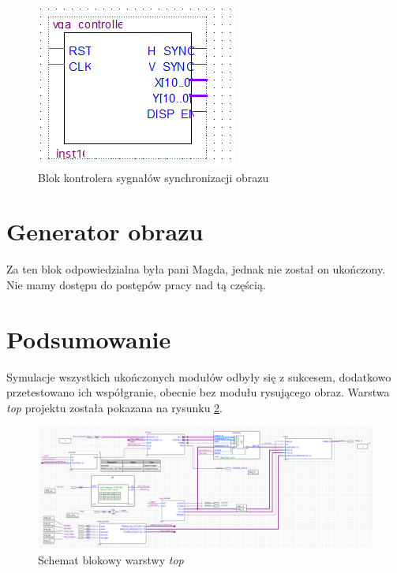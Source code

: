 \begin{figure}[H]
	\centering
	\includegraphics[width = 0.3 \paperwidth]{images/VGA_controller_block_diagram.png}
	\caption{Blok kontrolera sygnałów synchronizacji obrazu}
	\label{VGA_controller_block_diagram}
\end{figure}



\section{Generator obrazu}
Za ten blok odpowiedzialna była pani Magda, jednak nie został on ukończony. Nie mamy dostępu do postępów pracy nad tą częścią.

\section{Podsumowanie}
Symulacje wszystkich ukończonych modułów odbyły się z sukcesem, dodatkowo przetestowano ich współgranie, obecnie bez modułu rysującego obraz.
Warstwa \emph{top} projektu została pokazana na rysunku \ref{top_block_diagram}.

\begin{figure}[H]
	\centering
	\includegraphics[width = 0.75\paperwidth]{images/top_block_diagram.png}
	\caption{Schemat blokowy warstwy \emph{top}}
	\label{top_block_diagram}
\end{figure}

